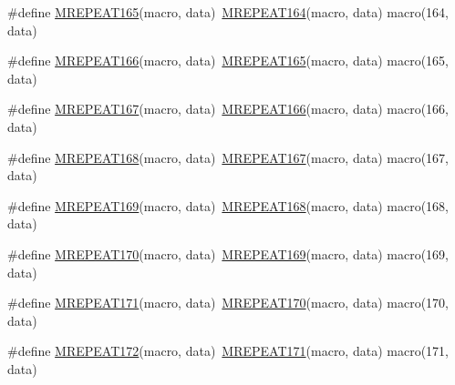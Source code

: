 \begin{DoxyCompactItemize}
\item 
\#define \mbox{\hyperlink{group__group__sam0__utils__mrepeat_gaf19e2008c064792f7ae367fab6867c12}{M\+R\+E\+P\+E\+A\+T165}}(macro,  data)~\mbox{\hyperlink{group__group__sam0__utils__mrepeat_ga5635a788c18814a98cca65d80c06dbfb}{M\+R\+E\+P\+E\+A\+T164}}(macro, data)   macro(164, data)
\item 
\#define \mbox{\hyperlink{group__group__sam0__utils__mrepeat_ga75661c9e3f382a6d40eb9da43d79f2d0}{M\+R\+E\+P\+E\+A\+T166}}(macro,  data)~\mbox{\hyperlink{group__group__sam0__utils__mrepeat_gaf19e2008c064792f7ae367fab6867c12}{M\+R\+E\+P\+E\+A\+T165}}(macro, data)   macro(165, data)
\item 
\#define \mbox{\hyperlink{group__group__sam0__utils__mrepeat_ga252652614e5e3cb056e487b105bd598c}{M\+R\+E\+P\+E\+A\+T167}}(macro,  data)~\mbox{\hyperlink{group__group__sam0__utils__mrepeat_ga75661c9e3f382a6d40eb9da43d79f2d0}{M\+R\+E\+P\+E\+A\+T166}}(macro, data)   macro(166, data)
\item 
\#define \mbox{\hyperlink{group__group__sam0__utils__mrepeat_ga4aa9bd592bf0f9b8f03254451d8693da}{M\+R\+E\+P\+E\+A\+T168}}(macro,  data)~\mbox{\hyperlink{group__group__sam0__utils__mrepeat_ga252652614e5e3cb056e487b105bd598c}{M\+R\+E\+P\+E\+A\+T167}}(macro, data)   macro(167, data)
\item 
\#define \mbox{\hyperlink{group__group__sam0__utils__mrepeat_ga1ae14784af3853b01de5837b32a0fdd6}{M\+R\+E\+P\+E\+A\+T169}}(macro,  data)~\mbox{\hyperlink{group__group__sam0__utils__mrepeat_ga4aa9bd592bf0f9b8f03254451d8693da}{M\+R\+E\+P\+E\+A\+T168}}(macro, data)   macro(168, data)
\item 
\#define \mbox{\hyperlink{group__group__sam0__utils__mrepeat_gaf79db8520fe014aa43b33eca106b66df}{M\+R\+E\+P\+E\+A\+T170}}(macro,  data)~\mbox{\hyperlink{group__group__sam0__utils__mrepeat_ga1ae14784af3853b01de5837b32a0fdd6}{M\+R\+E\+P\+E\+A\+T169}}(macro, data)   macro(169, data)
\item 
\#define \mbox{\hyperlink{group__group__sam0__utils__mrepeat_ga4f35da901f3f846301ba22c2ebfd64a4}{M\+R\+E\+P\+E\+A\+T171}}(macro,  data)~\mbox{\hyperlink{group__group__sam0__utils__mrepeat_gaf79db8520fe014aa43b33eca106b66df}{M\+R\+E\+P\+E\+A\+T170}}(macro, data)   macro(170, data)
\item 
\#define \mbox{\hyperlink{group__group__sam0__utils__mrepeat_ga6eb1cc1bab798bbc69ffcf54897bb268}{M\+R\+E\+P\+E\+A\+T172}}(macro,  data)~\mbox{\hyperlink{group__group__sam0__utils__mrepeat_ga4f35da901f3f846301ba22c2ebfd64a4}{M\+R\+E\+P\+E\+A\+T171}}(macro, data)   macro(171, data)

\end{DoxyCompactItemize}
